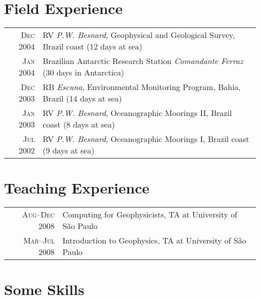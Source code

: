 \documentclass[a4paper,11pt]{article}
\begin{document}

\section{Field Experience}

\begin{tabular}{rl}
\textsc{Dec} 2004 & RV \emph{P.W. Besnard}, Geophysical and Geological Survey, Brazil coast \footnotesize{(12 days at sea)}\\
\textsc{Jan} 2004 & Brazilian Antarctic Research Station \emph{Comandante Ferraz} \footnotesize{(30 days in Antarctica)}\\
\textsc{Dec} 2003 & RB \emph{Escuna}, Environmental Monitoring Program, Bahia, Brazil \footnotesize{(14 days at sea)}\\
\textsc{Jan} 2003 & RV \emph{P.W. Besnard}, Oceanographic Moorings II, Brazil coast \footnotesize{(8 days at sea)}\\
\textsc{Jul} 2002 & RV \emph{P.W. Besnard}, Oceanographic Moorings I, Brazil coast \footnotesize{(9 days at sea)}
\end{tabular}


\section{Teaching Experience}

\begin{tabular}{rl}
\textsc{Aug--Dec} 2008 & Computing for Geophysicists, TA at University of S\~ao Paulo\\
\textsc{Mar--Jul} 2008 & Introduction to Geophysics, TA at University of S\~ao Paulo
\end{tabular}


\section{Some Skills}
\end{document}
